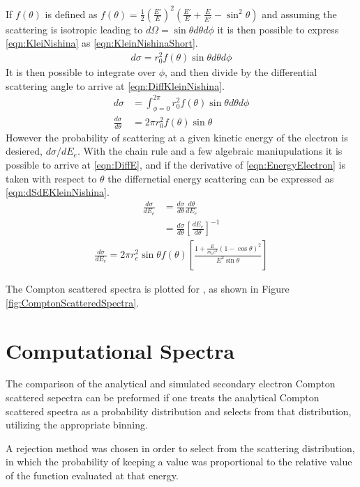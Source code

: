 \documentclass[draftcls,onecolumn]{IEEEtran}
\begin{document}
If $f(\theta)$ is defined as $f(\theta) = \frac{1}{2}\left(\frac{E'}{E}\right)^2 \left(\frac{E'}{E} + \frac{E}{E'}-\sin^2\theta\right)$ and assuming the scattering is isotropic leading to $d\Omega = \sin\theta d\theta d\phi$ it is then possible to express \eqref{eqn:KleiNishina} as \eqref{eqn:KleinNishinaShort}.
\begin{align}
  \label{eqn:KleinNishinaShort}
    d\sigma = r_0^2 f(\theta)\sin\theta d\theta d\phi
\end{align}
It is then possible to integrate over $\phi$, and then divide by the differential scattering angle to arrive at \eqref{eqn:DiffKleinNishina}.
\begin{align}
  \label{eqn:DiffKleinNishina}
  d\sigma &=\int_{\phi=0}^{2\pi} r_0^2 f(\theta)\sin\theta d\theta d\phi\\
  \frac{d\sigma}{d\theta} &=2\pi r_0^2 f(\theta)\sin\theta
\end{align}
However the probability of scattering at a given kinetic energy of the electron is desiered, $d\sigma/dE_e$.
With the chain rule and a few algebraic maniupulations it is possible to arrive at \eqref{eqn:DiffE}, and if the derivative of \eqref{eqn:EnergyElectron} is taken with respect to $\theta$ the differnetial energy scattering can be expressed as \eqref{eqn:dSdEKleinNishina}.
\begin{align}
  \label{eqn:DiffE}
  \frac{d\sigma}{dE_e} & = \frac{d\sigma}{d\theta} \frac{d\theta}{dE_e} \\
   & = \frac{d\sigma}{d\theta} \left[\frac{dE_e}{d\theta}\right]^{-1} 
\end{align}
\begin{align}
  \label{eqn:dSdEKleinNishina}
\frac{d\sigma}{dE_e} = 2\pi r_e^2 \sin \theta f(\theta)\left [ \frac{1+\frac{E}{m_e c^2}\left(1-\cos\theta \right)^2}{E^2 \sin \theta} \right ]
\end{align}

The Compton scattered spectra is plotted for , as shown in Figure \ref{fig:ComptonScatteredSpectra}.

\section{Computational Spectra}
The comparison of the analytical and simulated secondary electron Compton scattered sepectra can be preformed if one treats the analytical Compton scattered spectra as a probability distribution and selects from that distribution, utilizing the appropriate binning.

A rejection method was chosen in order to select from the scattering distribution, in which the probability of keeping a value was proportional to the relative value of the function evaluated at that energy.
\end{document}
